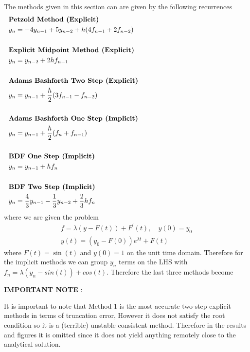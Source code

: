 \documentclass[12pt]{article}
\theoremstyle{remark}
\begin{document}
The methods given in this section can are given by the following recurrences
\begin{align}
	& \textbf{Petzold Method (Explicit)} \hspace{7.5cm} \notag \\
	& y_n = -4y_{n-1} + 5y_{n-2} + h(4f_{n-1} + 2f_{n-2}) \\
	\notag \\
	& \textbf{Explicit Midpoint Method (Explicit)} \notag \\
	& y_n = y_{n-2} + 2hf_{n-1} \\
	\notag \\
	& \textbf{Adams Bashforth Two Step (Explicit)} \notag \\
	& y_n = y_{n-1} + \frac{h}{2}(3f_{n-1} - f_{n-2}) \\
	\notag \\
	& \textbf{Adams Bashforth One Step (Implicit)} \notag \\
	& y_n = y_{n-1} + \frac{h}{2}(f_n + f_{n-1}) \\ 
	\notag \\
	& \textbf{BDF One Step (Implicit)} \notag \\
	& y_n = y_{n-1} + hf_n \\
	\notag \\
	& \textbf{BDF Two Step (Implicit)} \notag \\
	& y_n = \frac{4}{3}y_{n-1} - \frac{1}{3}y_{n-2} + \frac{2}{3}hf_n
\end{align} 
where we are given the problem 
\begin{align}
	f = \lambda(y - F(t)) + F^\prime(t), \quad y(0) = y_0 \\
	y(t) = (y_0 - F(0))e^{\lambda t} + F(t)
\end{align}
where $F(t) = \sin(t)$ and $y(0) = 1$ on the unit time domain. Therefore for the implicit methods we can group $y_n$ terms on the LHS with $f_n = \lambda(y_n - sin(t)) + cos(t)$. Therefore the last three methods become

\vspace{0.5cm}

\textbf{IMPORTANT NOTE} : \vspace{.1cm}

It is important to note that Method 1 is the most accurate two-step explicit methods in terms of truncation error, However it does not satisfy the root condition so it is a (terrible) unstable consistent method. Therefore in the results and figures it is omitted since it does not yield anything remotely close to the analytical solution.
\end{document}
